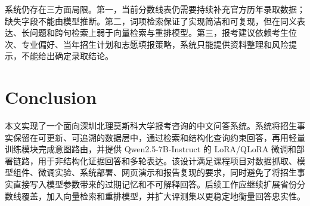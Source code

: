 \documentclass[UTF8,a4paper,11pt]{ctexart}
\begin{document}
系统仍存在三方面局限。第一，当前分数线表仍需要持续补充官方历年录取数据；缺失字段不能由模型推断。第二，词项检索保证了实现简洁和可复现，但在同义表达、长问题和跨句检索上弱于向量检索与重排模型。第三，报考建议依赖考生位次、专业偏好、当年招生计划和志愿填报策略，系统只能提供资料整理和风险提示，不能给出确定录取结论。

\section{Conclusion}

本文实现了一个面向深圳北理莫斯科大学报考咨询的中文问答系统。系统将招生事实保留在可更新、可追溯的数据层中，通过检索和结构化查询约束回答，再用轻量训练模块完成意图路由，并提供 Qwen2.5-7B-Instruct 的 LoRA/QLoRA 微调和部署链路，用于非结构化证据回答和多轮表达。该设计满足课程项目对数据抓取、模型组件、微调实验、系统部署、网页演示和报告复现的要求，同时避免了将招生事实直接写入模型参数带来的过期记忆和不可解释回答。后续工作应继续扩展省份分数线覆盖，加入向量检索和重排模型，并扩大评测集以更稳定地衡量回答忠实性。
\end{document}
